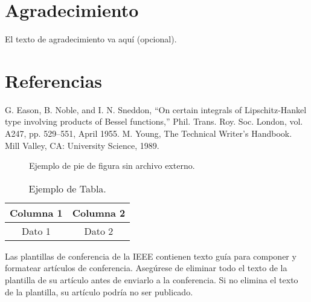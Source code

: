 \documentclass[conference]{IEEEtran}
\begin{document}
\section*{Agradecimiento}
El texto de agradecimiento va aquí (opcional).

\section*{Referencias}
\begin{thebibliography}{00}
 G. Eason, B. Noble, and I. N. Sneddon, ``On certain integrals of Lipschitz-Hankel type involving products of Bessel functions,'' Phil. Trans. Roy. Soc. London, vol. A247, pp. 529--551, April 1955.
 M. Young, The Technical Writer's Handbook. Mill Valley, CA: University Science, 1989.
\end{thebibliography}

\begin{figure}[htbp]
\centering
\fbox{\rule[0pt]{0pt}{50pt}\rule{0.4\textwidth}{0pt}} %
\caption{Ejemplo de pie de figura sin archivo externo.}
\label{fig}
\end{figure}

\begin{table}[htbp]
\caption{Ejemplo de Tabla.}
\begin{center}
\begin{tabular}{|c|c|}
\hline
\textbf{Columna 1}&\textbf{Columna 2} \\
\hline
Dato 1& Dato 2 \\
\hline
\end{tabular}
\label{tab1}
\end{center}
\end{table}

\vspace{12pt}
\color{red}
Las plantillas de conferencia de la IEEE contienen texto guía para componer y formatear artículos de conferencia. 
Asegúrese de eliminar todo el texto de la plantilla de su artículo antes de enviarlo a la conferencia. 
Si no elimina el texto de la plantilla, su artículo podría no ser publicado.
\end{document}
